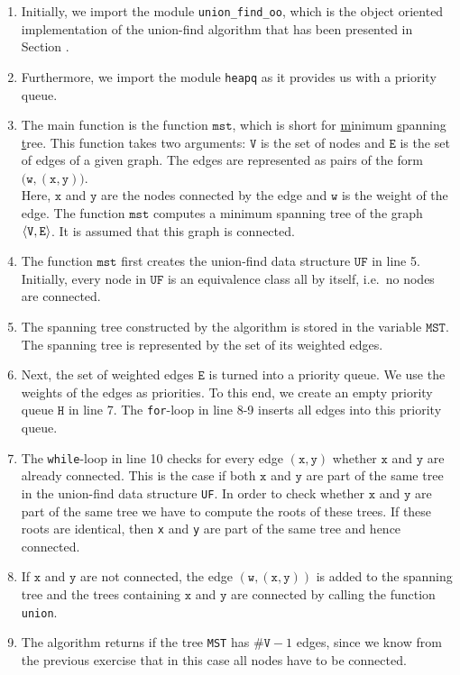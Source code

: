 \begin{enumerate}
\item Initially, we import the module \texttt{union\_find\_oo}, which is the object oriented 
      implementation of the union-find algorithm that has been presented in Section \label{sec:union-find-oo}.
\item Furthermore, we import the module \texttt{heapq} as it provides us with a priority queue.
\item The main function is the function $\texttt{mst}$, which is short for \underline{m}inimum
      \underline{s}panning \underline{t}ree.  This function takes two arguments:
      $\texttt{V}$ is the set of nodes and $\texttt{E}$ is the set of edges of a given graph.  The edges are represented as
      pairs of the form
      \\[0.2cm]
      \hspace*{1.3cm}
      $\bigl(\texttt{w}, (\texttt{x}, \texttt{y})\bigr)$.
      \\[0.2cm] 
      Here, $\texttt{x}$ and $\texttt{y}$ are the nodes connected by the edge and $\texttt{w}$ is the
      weight of the edge.  The function $\texttt{mst}$ computes a minimum spanning tree of  the
      graph  $\pair(\texttt{V},\texttt{E})$.  It is assumed that this graph is connected.
\item The function $\texttt{mst}$ first creates the union-find data structure $\texttt{UF}$ in line 5.
      Initially, every node in $\texttt{UF}$ is  an equivalence class all by itself, i.e.~no nodes
      are connected.
\item The spanning tree constructed by the algorithm is stored in the variable $\texttt{MST}$.
      The spanning tree is represented by the set of its weighted edges.  
\item Next, the set of weighted edges $\texttt{E}$ is turned into a priority queue.
      We use the weights of the edges as priorities. 
      To this end, we create an empty priority queue $\texttt{H}$ in line 7.
      The \texttt{for}-loop in line 8-9 inserts all edges into this priority queue.
\item The \texttt{while}-loop in line 10 checks for every edge $(\texttt{x},\texttt{y})$  whether $\texttt{x}$ and $\texttt{y}$ are already
      connected.  This is the case if both $\texttt{x}$ and $\texttt{y}$ are part of the same tree
      in the union-find data structure \texttt{UF}.  In order to
      check whether $\texttt{x}$ and $\texttt{y}$ are part of the same tree
      we have to compute the roots of these trees. 
      If these roots are identical, then \texttt{x} and \texttt{y} are part of the same tree and hence
      connected. 
\item If $\texttt{x}$ and $\texttt{y}$ are not connected, the  edge $(\texttt{w}, (\texttt{x}, \texttt{y}))$ is added to the
      spanning tree and the trees containing $\texttt{x}$ and $\texttt{y}$ are connected by calling the function
      \texttt{union}.
\item The algorithm returns if the tree \texttt{MST} has $\texttt{\#V}-1$ edges, since we know from the previous
      exercise that in this case all nodes have to be connected.
\end{enumerate}


